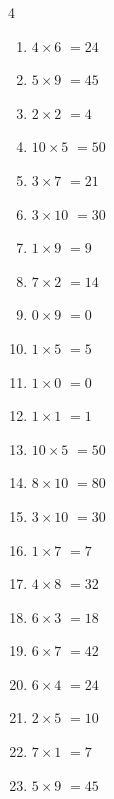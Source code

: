 \begin{multicols}{4}
\begin{enumerate}
  \item $4\times 6$
        $=24$

  \item $5\times 9$
        $=45$

  \item $2\times 2$
        $=4$

  \item $10\times 5$
        $=50$

  \item $3\times 7$
        $=21$

  \item $3\times 10$
        $=30$

  \item $1\times 9$
        $=9$

  \item $7\times 2$
        $=14$

  \item $0\times 9$
        $=0$

\columnbreak %

  \item $1\times 5$
        $=5$

  \item $1\times 0$
        $=0$

  \item $1\times 1$
        $=1$

  \item $10\times 5$
        $=50$

  \item $8\times 10$
        $=80$

  \item $3\times 10$
        $=30$

  \item $1\times 7$
        $=7$

  \item $4\times 8$
        $=32$

  \item $6\times 3$
        $=18$

  \item $6\times 7$
        $=42$

  \item $6\times 4$
        $=24$

  \item $2\times 5$
        $=10$

  \item $7\times 1$
        $=7$

  \item $5\times 9$
        $=45$


\end{enumerate}
\end{multicols}
